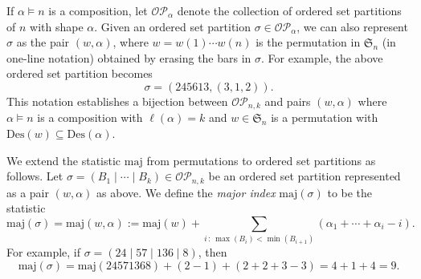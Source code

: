 \documentclass[10pt]{amsart}
\theoremstyle{definition}
\newcommand{\maj}{{\mathrm {maj}}}
\newcommand{\inv}{{\mathrm {inv}}}
\newcommand{\Des}{{\mathrm {Des}}}
\newcommand{\symm}{{\mathfrak{S}}}
\newcommand{\OP}{{\mathcal{OP}}}
\begin{document}
If $\alpha \models n$ is a composition, let $\OP_{\alpha}$ denote the collection of ordered set partitions of $n$ with shape $\alpha$.  
Given an ordered set partition $\sigma \in \OP_{\alpha}$, we can also represent $\sigma$ as the pair
$(w, \alpha)$, where $w = w(1) \cdots w(n)$ is the permutation in $\symm_n$ (in one-line notation) obtained by erasing 
the bars in $\sigma$.  For example, the above ordered set partition becomes
\begin{equation*}
\sigma = (245613, (3,1,2)).
\end{equation*}
This notation establishes a bijection between $\OP_{n,k}$ and pairs $(w, \alpha)$ where $\alpha \models n$ 
is a composition with $\ell(\alpha) = k$ and $w \in \symm_n$ is a permutation with $\Des(w) \subseteq \Des(\alpha)$.





We extend the statistic $\maj$ from permutations to ordered set partitions as follows.
Let $\sigma = (B_1 \mid \cdots \mid B_k) \in \OP_{n,k}$ be an ordered set partition represented as a pair $(w, \alpha)$ as above.  
We define the \emph{major index} $\maj(\sigma)$ to be the statistic
\begin{equation}
\maj(\sigma) = \maj(w, \alpha) := \maj(w) + \sum_{i \,  : \,  \max(B_i) < \min(B_{i+1})} (\alpha_1 + \cdots + \alpha_i - i).
\end{equation}
For example, if $\sigma = ( 2 4 \mid 5 7 \mid 1 3 6 \mid 8)$, then
\begin{equation*}
\maj(\sigma) = \maj(24571368) + (2 - 1) + (2 + 2 + 3 - 3) = 4 + 1 + 4 = 9.
\end{equation*}
\end{document}
